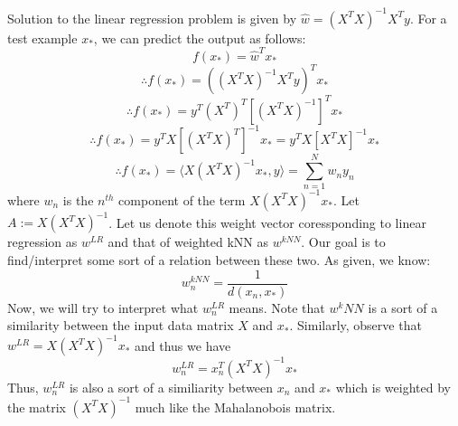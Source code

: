 \documentclass[a4paper,11pt]{article}
\begin{document}
\begin{mlsolution}

Solution to the linear regression problem is given by $\hat{w} = (X^{T}X)^{-1}X^{T}y$. For a test example $x_*$, we can predict the output as follows:
\[
f(x_*) = \hat{w}^{T}x_*
\]
\[
\therefore f(x_*) = ((X^{T}X)^{-1}X^{T}y)^{T}x_*
\]
\[
\therefore f(x_*) = y^{T}(X^{T})^{T}[(X^{T}X)^{-1}]^{T}x_*
\]
\[
\therefore f(x_*) = y^{T}X[(X^{T}X)^{T}]^{-1}x_* = y^{T}X[X^{T}X]^{-1}x_* 
\]
\[
\therefore f(x_*) = \langle X(X^{T}X)^{-1}x_*, y \rangle = \sum_{n = 1}^{N} w_n y_n
\]
where $w_n$ is the $n^{th}$ component of the term $X(X^{T}X)^{-1}x_*$. Let $A:= X(X^{T}X)^{-1}$. Let us denote this weight vector coressponding to linear regression as $w^{LR}$ and that of weighted kNN as $w^{kNN}.$ Our goal is to find/interpret some sort of a relation between these two. As given, we know:
\[
w^{kNN}_{n} = \frac{1}{d(x_n, x_*)}
\]
Now, we will try to interpret what $w^{LR}_n$ means. Note that $w^kNN$ is a sort of a similarity between the input data matrix $X$ and $x_*$. Similarly, observe that $w^{LR} = X(X^{T}X)^{-1}x_*$ and thus we have
\[
w^{LR}_n = x^{T}_{n}(X^{T}X)^{-1}x_*
\]
Thus, $w^{LR}_n$ is also a sort of a similiarity between $x_n$ and $x_*$ which is weighted by the matrix $(X^{T}X)^{-1}$ much like the Mahalanobois matrix.


\end{mlsolution}
\end{document}
